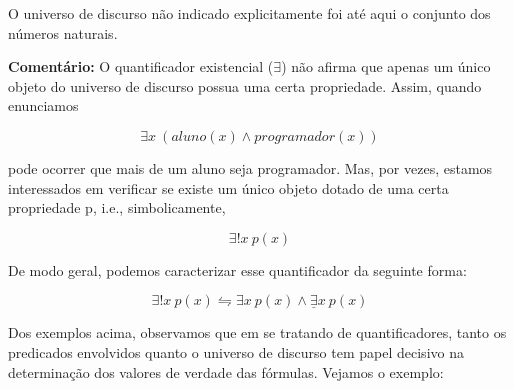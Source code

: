 \noindent O universo de discurso não indicado explicitamente foi até aqui o conjunto dos números naturais.

\noindent \textbf{Comentário:} O quantificador existencial ($\exists$) não afirma que apenas um único objeto do universo de discurso possua uma certa propriedade.
Assim, quando enunciamos

$$\exists x\ (aluno(x) \land programador(x))$$

\noindent pode ocorrer que mais de um aluno seja programador.
Mas, por vezes, estamos interessados em verificar se existe um único objeto dotado de uma certa propriedade p, i.e., simbolicamente,

$$\exists! x\ p(x)$$

De modo geral, podemos caracterizar esse quantificador da seguinte forma:

$$\exists! x\ p(x) \leftrightharpoons \exists x\ p(x) \land \underline{\exists}x\ p(x)$$

Dos exemplos acima, observamos que em se tratando de quantificadores, tanto os predicados envolvidos quanto o universo de discurso tem papel decisivo na determinação dos valores de verdade das fórmulas.
Vejamos o exemplo:
